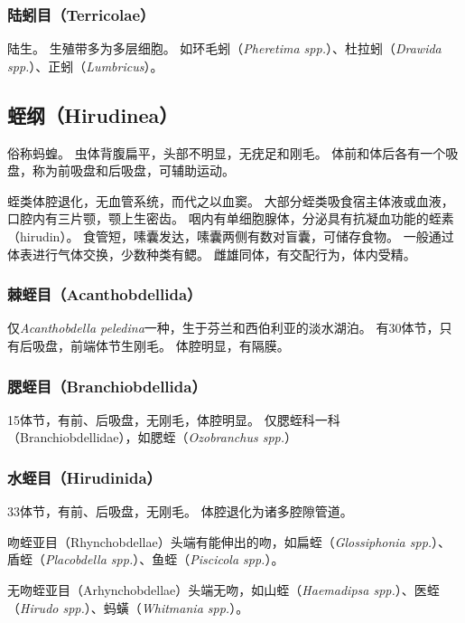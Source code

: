 \documentclass[11pt]{article}
\begin{document}
\subsubsection{陆蚓目（Terricolae）}
陆生。
生殖带多为多层细胞。
如环毛蚓（\textit{Pheretima spp.}）、杜拉蚓（\textit{Drawida spp.}）、正蚓（\textit{Lumbricus}）。

\subsection{蛭纲（Hirudinea）}
俗称蚂蝗。
虫体背腹扁平，头部不明显，无疣足和刚毛。
体前和体后各有一个吸盘，称为前吸盘和后吸盘，可辅助运动。

\newline

蛭类体腔退化，无血管系统，而代之以血窦。
大部分蛭类吸食宿主体液或血液，口腔内有三片颚，颚上生密齿。
咽内有单细胞腺体，分泌具有抗凝血功能的蛭素（hirudin）。
食管短，嗉囊发达，嗉囊两侧有数对盲囊，可储存食物。
一般通过体表进行气体交换，少数种类有鳃。
雌雄同体，有交配行为，体内受精。

\subsubsection{棘蛭目（Acanthobdellida）}
仅\textit{Acanthobdella peledina}一种，生于芬兰和西伯利亚的淡水湖泊。
有30体节，只有后吸盘，前端体节生刚毛。
体腔明显，有隔膜。

\subsubsection{腮蛭目（Branchiobdellida）}
15体节，有前、后吸盘，无刚毛，体腔明显。
仅腮蛭科一科（Branchiobdellidae），如腮蛭（\textit{Ozobranchus spp.}）

\subsubsection{水蛭目（Hirudinida）}
33体节，有前、后吸盘，无刚毛。
体腔退化为诸多腔隙管道。

\newline

吻蛭亚目（Rhynchobdellae）头端有能伸出的吻，如扁蛭（\textit{Glossiphonia spp.}）、盾蛭（\textit{Placobdella spp.}）、鱼蛭（\textit{Piscicola spp.}）。

\newline

无吻蛭亚目（Arhynchobdellae）头端无吻，如山蛭（\textit{Haemadipsa spp.}）、医蛭（\textit{Hirudo spp.}）、蚂蟥（\textit{Whitmania spp.}）。
\end{document}
